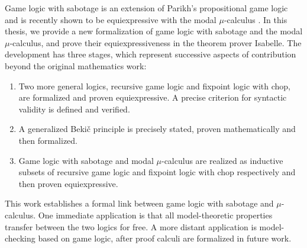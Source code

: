 
Game logic with sabotage is an extension of Parikh's propositional game logic and is recently shown to be equiexpressive with the modal $\mu$-calculus \cite{Wafa_2024}. In this thesis, we provide a new formalization of game logic with sabotage and the modal $\mu$-calculus, and prove their equiexpressiveness in the theorem prover Isabelle. The development has three stages, which represent successive aspects of contribution beyond the original mathematics work:
\begin{enumerate}
    \item Two more general logics, recursive game logic and fixpoint logic with chop, are formalized and proven equiexpressive. A precise criterion for syntactic validity is defined and verified.
    \item A generalized Beki\v{c} principle is precisely stated, proven mathematically and then formalized.
    \item Game logic with sabotage and modal $\mu$-calculus are realized as inductive subsets of recursive game logic and fixpoint logic with chop respectively and then proven equiexpressive.
\end{enumerate}
This work establishes a formal link between game logic with sabotage and $\mu$-calculus. One immediate application is that all model-theoretic properties transfer between the two logics for free. A more distant application is model-checking based on game logic, after proof calculi are formalized in future work.